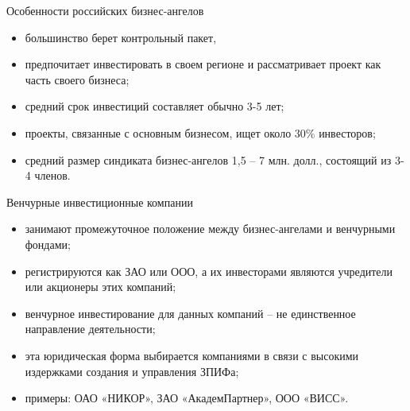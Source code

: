 \documentclass[_Venture_p2.tex]{subfiles}
\begin{document}
\begin{frame}{Особенности российских бизнес-ангелов}{}
\begin{itemize}
	\item большинство берет контрольный пакет, 
	\item предпочитает инвестировать в своем регионе и рассматривает проект как часть своего бизнеса; 
	\item средний срок инвестиций составляет обычно 3-5 лет; 
	\item проекты, связанные с основным бизнесом, ищет около 30\% инвесторов; 
	\item средний размер синдиката бизнес-ангелов 1,5 – 7 млн. долл., состоящий из 3-4 членов.
\end{itemize}
\end{frame}

\begin{frame}[allowframebreaks]{Венчурные инвестиционные компании}{}
\begin{itemize}
	\item занимают промежуточное положение между бизнес-ангелами и венчурными фондами;
	\item регистрируются как ЗАО или ООО, а их инвесторами являются учредители или акционеры этих компаний;
	\item венчурное инвестирование для данных компаний – не единственное направление деятельности;
	
	\pagebreak
	\item эта юридическая форма выбирается компаниями в связи с высокими издержками создания и управления ЗПИФа;
	\item примеры: ОАО «НИКОР», ЗАО «АкадемПартнер», ООО «ВИСС». 
\end{itemize}
\end{frame}
\end{document}
